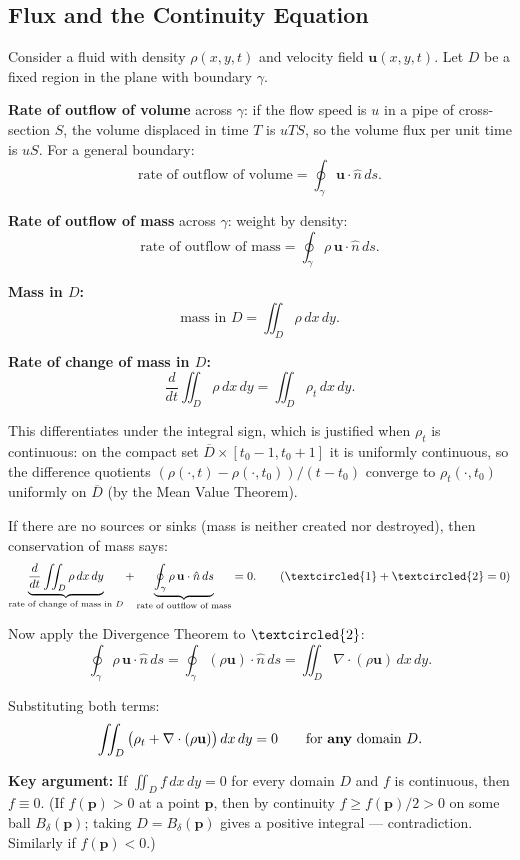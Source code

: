 \documentclass[11pt]{report}
\begin{document}
\subsection*{Flux and the Continuity Equation}

Consider a fluid with density $\rho(x, y, t)$ and velocity field $\mathbf{u}(x, y, t)$. Let $D$ be a fixed region in the plane with boundary $\gamma$.

\textbf{Rate of outflow of volume} across $\gamma$: if the flow speed is $u$ in a pipe of cross-section $S$, the volume displaced in time $T$ is $uTS$, so the volume flux per unit time is $uS$. For a general boundary:
\[
\text{rate of outflow of volume} = \oint_\gamma \mathbf{u} \cdot \hat{n} \, ds.
\]

\textbf{Rate of outflow of mass} across $\gamma$: weight by density:
\[
\text{rate of outflow of mass} = \oint_\gamma \rho \, \mathbf{u} \cdot \hat{n} \, ds.
\]

\textbf{Mass in $D$:}
\[
\text{mass in } D = \iint_D \rho \, dx \, dy.
\]

\textbf{Rate of change of mass in $D$:}
\[
\frac{d}{dt} \iint_D \rho \, dx \, dy = \iint_D \rho_t \, dx \, dy.
\]

This differentiates under the integral sign, which is justified when $\rho_t$ is continuous: on the compact set $\overline{D} \times [t_0 - 1, t_0 + 1]$ it is uniformly continuous, so the difference quotients $(\rho(\cdot, t) - \rho(\cdot, t_0))/(t - t_0)$ converge to $\rho_t(\cdot, t_0)$ uniformly on $\overline{D}$ (by the Mean Value Theorem).

If there are no sources or sinks (mass is neither created nor destroyed), then conservation of mass says:
\[
\underbrace{\frac{d}{dt} \iint_D \rho \, dx \, dy}_{\text{rate of change of mass in } D} + \underbrace{\oint_\gamma \rho \, \mathbf{u} \cdot \hat{n} \, ds}_{\text{rate of outflow of mass}} = 0. \tag{$\textcircled{1} + \textcircled{2} = 0$}
\]

Now apply the Divergence Theorem to $\textcircled{2}$:
\[
\oint_\gamma \rho \, \mathbf{u} \cdot \hat{n} \, ds = \oint_\gamma (\rho \mathbf{u}) \cdot \hat{n} \, ds = \iint_D \nabla \cdot (\rho \mathbf{u}) \, dx \, dy.
\]

Substituting both terms:
\[
\iint_D \big( \rho_t + \nabla \cdot (\rho \mathbf{u}) \big) \, dx \, dy = 0 \qquad \text{for \textbf{any} domain } D.
\]

\textbf{Key argument:} If $\iint_D f \, dx \, dy = 0$ for every domain $D$ and $f$ is continuous, then $f \equiv 0$. (If $f(\mathbf{p}) > 0$ at a point $\mathbf{p}$, then by continuity $f \geq f(\mathbf{p})/2 > 0$ on some ball $B_\delta(\mathbf{p})$; taking $D = B_\delta(\mathbf{p})$ gives a positive integral --- contradiction. Similarly if $f(\mathbf{p}) < 0$.)
\end{document}

